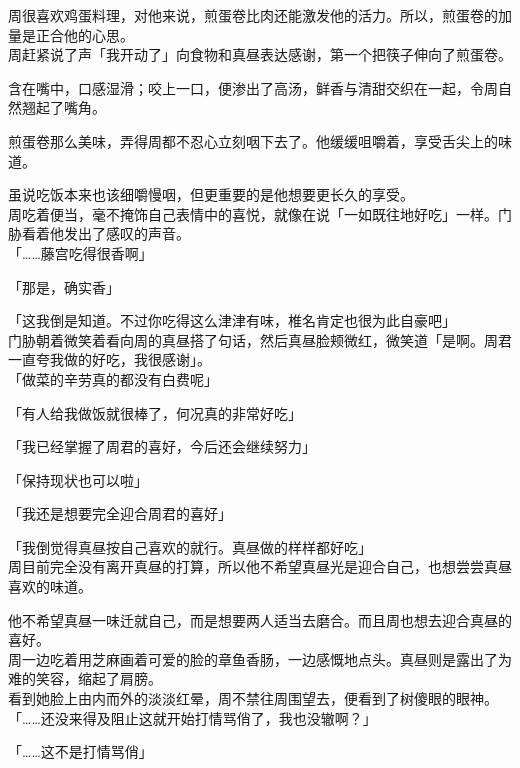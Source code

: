 周很喜欢鸡蛋料理，对他来说，煎蛋卷比肉还能激发他的活力。所以，煎蛋卷的加量是正合他的心思。\\

周赶紧说了声「我开动了」向食物和真昼表达感谢，第一个把筷子伸向了煎蛋卷。

含在嘴中，口感湿滑；咬上一口，便渗出了高汤，鲜香与清甜交织在一起，令周自然翘起了嘴角。

煎蛋卷那么美味，弄得周都不忍心立刻咽下去了。他缓缓咀嚼着，享受舌尖上的味道。

虽说吃饭本来也该细嚼慢咽，但更重要的是他想要更长久的享受。\\

周吃着便当，毫不掩饰自己表情中的喜悦，就像在说「一如既往地好吃」一样。门胁看着他发出了感叹的声音。\\

「……藤宫吃得很香啊」

「那是，确实香」

「这我倒是知道。不过你吃得这么津津有味，椎名肯定也很为此自豪吧」\\

门胁朝着微笑着看向周的真昼搭了句话，然后真昼脸颊微红，微笑道「是啊。周君一直夸我做的好吃，我很感谢」。\\

「做菜的辛劳真的都没有白费呢」

「有人给我做饭就很棒了，何况真的非常好吃」

「我已经掌握了周君的喜好，今后还会继续努力」

「保持现状也可以啦」

「我还是想要完全迎合周君的喜好」

「我倒觉得真昼按自己喜欢的就行。真昼做的样样都好吃」\\

周目前完全没有离开真昼的打算，所以他不希望真昼光是迎合自己，也想尝尝真昼喜欢的味道。

他不希望真昼一味迁就自己，而是想要两人适当去磨合。而且周也想去迎合真昼的喜好。\\

周一边吃着用芝麻画着可爱的脸的章鱼香肠，一边感慨地点头。真昼则是露出了为难的笑容，缩起了肩膀。\\

看到她脸上由内而外的淡淡红晕，周不禁往周围望去，便看到了树傻眼的眼神。\\

「……还没来得及阻止这就开始打情骂俏了，我也没辙啊？」

「……这不是打情骂俏」

